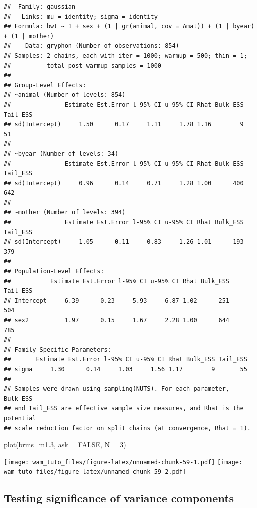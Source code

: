 \documentclass[
  12pt,
]{book}
\newenvironment{Shaded}{\begin{snugshade}}{\end{snugshade}}
\newcommand{\AttributeTok}[1]{\textcolor[rgb]{0.77,0.63,0.00}{#1}}
\newcommand{\ConstantTok}[1]{\textcolor[rgb]{0.00,0.00,0.00}{#1}}
\newcommand{\DecValTok}[1]{\textcolor[rgb]{0.00,0.00,0.81}{#1}}
\newcommand{\FloatTok}[1]{\textcolor[rgb]{0.00,0.00,0.81}{#1}}
\newcommand{\FunctionTok}[1]{\textcolor[rgb]{0.00,0.00,0.00}{#1}}
\newcommand{\NormalTok}[1]{#1}
\begin{document}
\begin{verbatim}
##  Family: gaussian 
##   Links: mu = identity; sigma = identity 
## Formula: bwt ~ 1 + sex + (1 | gr(animal, cov = Amat)) + (1 | byear) + (1 | mother) 
##    Data: gryphon (Number of observations: 854) 
## Samples: 2 chains, each with iter = 1000; warmup = 500; thin = 1;
##          total post-warmup samples = 1000
## 
## Group-Level Effects: 
## ~animal (Number of levels: 854) 
##               Estimate Est.Error l-95% CI u-95% CI Rhat Bulk_ESS Tail_ESS
## sd(Intercept)     1.50      0.17     1.11     1.78 1.16        9       51
## 
## ~byear (Number of levels: 34) 
##               Estimate Est.Error l-95% CI u-95% CI Rhat Bulk_ESS Tail_ESS
## sd(Intercept)     0.96      0.14     0.71     1.28 1.00      400      642
## 
## ~mother (Number of levels: 394) 
##               Estimate Est.Error l-95% CI u-95% CI Rhat Bulk_ESS Tail_ESS
## sd(Intercept)     1.05      0.11     0.83     1.26 1.01      193      379
## 
## Population-Level Effects: 
##           Estimate Est.Error l-95% CI u-95% CI Rhat Bulk_ESS Tail_ESS
## Intercept     6.39      0.23     5.93     6.87 1.02      251      504
## sex2          1.97      0.15     1.67     2.28 1.00      644      785
## 
## Family Specific Parameters: 
##       Estimate Est.Error l-95% CI u-95% CI Rhat Bulk_ESS Tail_ESS
## sigma     1.30      0.14     1.03     1.56 1.17        9       55
## 
## Samples were drawn using sampling(NUTS). For each parameter, Bulk_ESS
## and Tail_ESS are effective sample size measures, and Rhat is the potential
## scale reduction factor on split chains (at convergence, Rhat = 1).
\end{verbatim}

\begin{Shaded}
\begin{Highlighting}[]
\FunctionTok{plot}\NormalTok{(brms\_m1}\FloatTok{.3}\NormalTok{, }\AttributeTok{ask =} \ConstantTok{FALSE}\NormalTok{, }\AttributeTok{N =} \DecValTok{3}\NormalTok{)}
\end{Highlighting}
\end{Shaded}

\texttt{[image: wam\_tuto\_files/figure-latex/unnamed-chunk-59-1.pdf]} \texttt{[image: wam\_tuto\_files/figure-latex/unnamed-chunk-59-2.pdf]}

\hypertarget{testing-significance-of-variance-components-1}{%
\subsection{Testing significance of variance components}\label{testing-significance-of-variance-components-1}}
\end{document}
